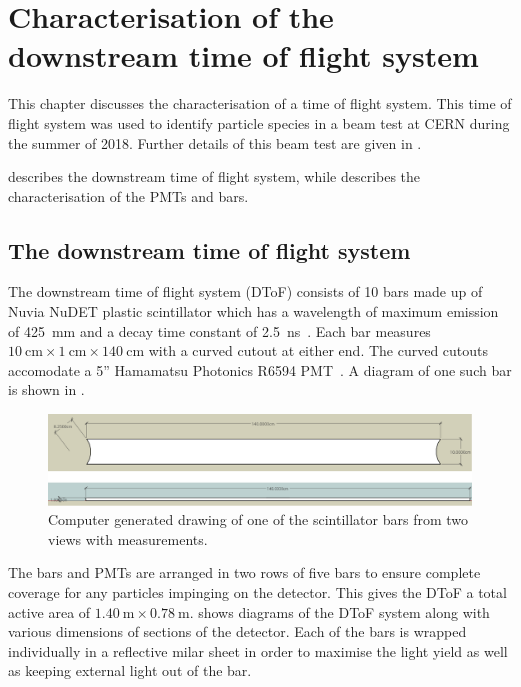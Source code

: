 \chapter{Characterisation of the downstream time of flight system}
\label{sec:hptpc_dtof_characterisation}

This chapter discusses the characterisation of a time of flight system.
This time of flight system was used to identify particle species in a beam test at CERN during the summer of 2018.
Further details of this beam test are given in .

 describes the downstream time of flight system, while  describes the characterisation of the PMTs and bars.

\section{The downstream time of flight system}
\label{sec:hptpc_dtof_characterisation:dtof}

The downstream time of flight system (DToF) consists of 10 bars made up of Nuvia NuDET plastic scintillator which has a wavelength of maximum emission of \SI{425}{\milli\metre} and a decay time constant of \SI{2.5}{\nano\second}~\cite{nuvia}.
Each bar measures $\SI{10}{\centi\metre} \times \SI{1}{\centi\metre} \times \SI{140}{\centi\metre}$ with a curved cutout at either end.
The curved cutouts accomodate a 5'' Hamamatsu Photonics R6594 PMT~\cite{hamamatsu}.
A diagram of one such bar is shown in .

\begin{figure}
  \centering
  \includegraphics[width=.8\linewidth]{files/figures/hptpc_dtof_characterisation/barDiag}
  \caption[HPTPC DToF bar diagram.]{Computer generated drawing of one of the scintillator bars from two views with measurements.}
  \label{fig:barDiag}
\end{figure}

The bars and PMTs are arranged in two rows of five bars to ensure complete coverage for any particles impinging on the detector.
This gives the DToF a total active area of $\SI{1.40}{\metre} \times \SI{0.78}{\metre}$.
 shows diagrams of the DToF system along with various dimensions of sections of the detector.
Each of the bars is wrapped individually in a reflective milar sheet in order to maximise the light yield as well as keeping external light out of the bar.


